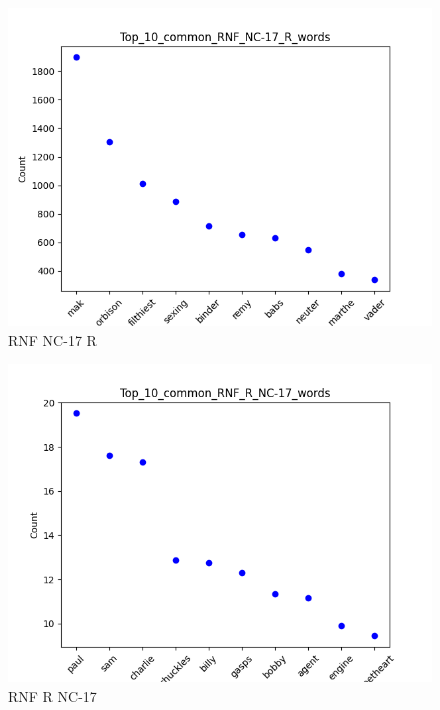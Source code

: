 \documentclass[a4paper]{article}
\begin{document}
\begin{figure}[ht]
    \centering
    \includegraphics[width=1\textwidth]{../stats/Top_10_common_RNF_NC-17_R_words.png}
    \caption{RNF NC-17 R}
\end{figure}


\begin{figure}[ht]
    \centering
    \includegraphics[width=1\textwidth]{../stats/Top_10_common_RNF_R_NC-17_words.png}
    \caption{RNF R NC-17}
\end{figure}
\end{document}
